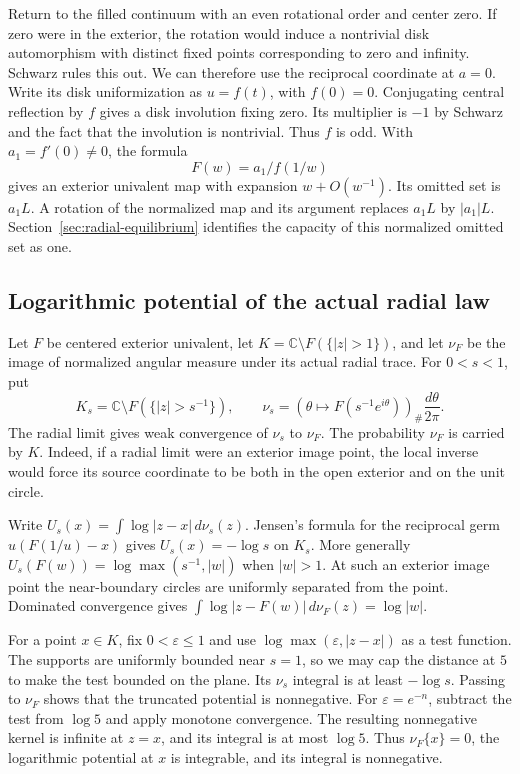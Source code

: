 \documentclass[11pt]{article}
\begin{document}
	Return to the filled continuum with an even rotational order and
	center zero. If zero were in the exterior, the rotation would
	induce a nontrivial disk automorphism with distinct fixed points
	corresponding to zero and infinity. Schwarz rules this out. We can
	therefore use the reciprocal coordinate at \(a=0\). Write its
	disk uniformization as \(u=f(t)\), with \(f(0)=0\). Conjugating
	central reflection by \(f\) gives a disk involution fixing zero.
	Its multiplier is \(-1\) by Schwarz and the fact that the
	involution is nontrivial. Thus \(f\) is odd. With
	\(a_1=f'(0)\ne0\), the formula
	\[
	F(w)=a_1/f(1/w)
	\]
	gives an exterior univalent map with expansion \(w+O(w^{-1})\).
	Its omitted set is \(a_1 L\). A rotation of the normalized map
	and its argument replaces \(a_1 L\) by \(|a_1|L\).
	Section~\ref{sec:radial-equilibrium} identifies the capacity of
	this normalized omitted set as one.
	\subsection{Logarithmic potential of the actual radial law}\label{sec:radial-potential}
	
	Let $F$ be centered exterior univalent, let $K=\mathbb C\setminus
	F(\{|z|>1\})$, and let $\nu_F$ be the image of normalized angular
	measure under its actual radial trace. For $0<s<1$, put
	\[
	K_s=\mathbb C\setminus F(\{|z|>s^{-1}\}),\qquad
	\nu_s=(\theta\mapsto F(s^{-1}e^{i\theta}))_\#\frac{d\theta}{2\pi}.
	\]
	The radial limit gives weak convergence of $\nu_s$ to $\nu_F$. The
	probability $\nu_F$ is carried by $K$. Indeed, if a radial limit were
	an exterior image point, the local inverse would force its source
	coordinate to be both in the open exterior and on the unit circle.
	
	Write $U_s(x)=\int\log|z-x|\,d\nu_s(z)$. Jensen's formula for the
	reciprocal germ $u(F(1/u)-x)$ gives $U_s(x)=-\log s$ on $K_s$.
	More generally $U_s(F(w))=\log\max(s^{-1},|w|)$ when $|w|>1$.
	At such an exterior image point the near-boundary circles are
	uniformly separated from the point. Dominated convergence gives
	$\int\log|z-F(w)|\,d\nu_F(z)=\log|w|$.
	
	For a point $x\in K$, fix $0<\varepsilon\le 1$ and use
	$\log\max(\varepsilon,|z-x|)$ as a test function. The supports are
	uniformly bounded near $s=1$, so we may cap the distance at $5$ to
	make the test bounded on the plane. Its $\nu_s$ integral is at
	least $-\log s$. Passing to $\nu_F$ shows that the truncated
	potential is nonnegative. For $\varepsilon=e^{-n}$, subtract
	the test from $\log 5$ and apply monotone convergence. The resulting
	nonnegative kernel is infinite at $z=x$, and its integral is at
	most $\log 5$. Thus $\nu_F\{x\}=0$, the logarithmic potential at
	$x$ is integrable, and its integral is nonnegative.
	
\end{document}
